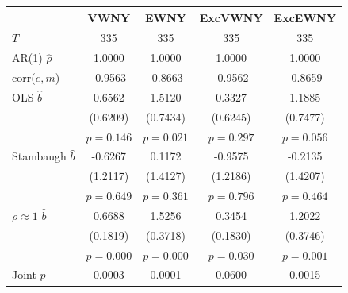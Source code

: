 \begin{tabular}{lcccc}
\toprule
 & VWNY & EWNY & ExcVWNY & ExcEWNY \\
\midrule
$T$ & 335 & 335 & 335 & 335 \\
AR(1) $\hat\rho$ & 1.0000 & 1.0000 & 1.0000 & 1.0000 \\
corr($e,m$) & -0.9563 & -0.8663 & -0.9562 & -0.8659 \\
\midrule
OLS $\hat b$ & 0.6562 & 1.5120 & 0.3327 & 1.1885 \\
 & (0.6209) & (0.7434) & (0.6245) & (0.7477) \\
 & $p=0.146$ & $p=0.021$ & $p=0.297$ & $p=0.056$ \\
Stambaugh $\hat b$ & -0.6267 & 0.1172 & -0.9575 & -0.2135 \\
 & (1.2117) & (1.4127) & (1.2186) & (1.4207) \\
 & $p=0.649$ & $p=0.361$ & $p=0.796$ & $p=0.464$ \\
$\rho\approx1$ $\hat b$ & 0.6688 & 1.5256 & 0.3454 & 1.2022 \\
 & (0.1819) & (0.3718) & (0.1830) & (0.3746) \\
 & $p=0.000$ & $p=0.000$ & $p=0.030$ & $p=0.001$ \\
\midrule
Joint $p$ & 0.0003 & 0.0001 & 0.0600 & 0.0015 \\
\bottomrule
\end{tabular}
